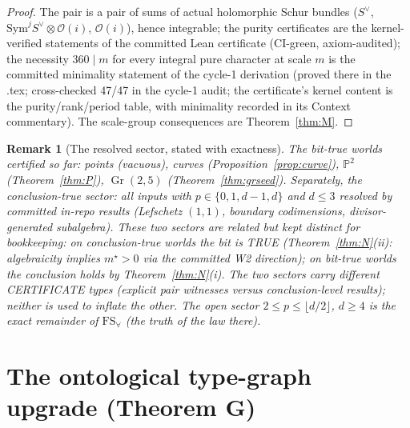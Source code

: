 \documentclass[11pt]{article}
\newtheorem{remark}[theorem]{Remark}
\newcommand{\Oo}{\mathcal{O}}
\newcommand{\tensor}{\otimes}
\newcommand{\Pp}{\mathbb{P}}
\newcommand{\Gr}{\operatorname{Gr}}
\newcommand{\FS}{\mathrm{FS}_\forall}
\begin{document}
\begin{proof}
The pair is a pair of sums of actual holomorphic Schur bundles
($S^\vee$, $\mathrm{Sym}^jS^\vee\tensor\Oo(i)$, $\Oo(i)$), hence integrable;
the purity certificates are the kernel-verified statements of the committed
Lean certificate \cite{GST-gr25} (CI-green, axiom-audited); the necessity
$360\mid m$ for every integral pure character at scale $m$ is the committed
minimality statement of the cycle-1 derivation (proved there in the .tex;
cross-checked 47/47 in the cycle-1 audit; the certificate's kernel content is
the purity/rank/period table, with minimality recorded in its Context
commentary).  The scale-group consequences are Theorem~\ref{thm:M}.
\end{proof}

\begin{remark}[The resolved sector, stated with exactness]
\label{rem:resolved}
The \emph{bit-true} worlds certified so far: points (vacuous), curves
(Proposition~\ref{prop:curve}), $\Pp^2$ (Theorem~\ref{thm:P}),
$\Gr(2,5)$ (Theorem~\ref{thm:grseed}).  Separately, the
\emph{conclusion-true} sector: all inputs with $p\in\{0,1,d-1,d\}$ and
$d\le3$ resolved by committed in-repo results (Lefschetz $(1,1)$,
boundary codimensions, divisor-generated subalgebra).  These two sectors are
related but kept distinct for bookkeeping: on conclusion-true worlds the
bit is TRUE (Theorem~\ref{thm:N}(ii): algebraicity implies $m^\star>0$ via
the committed W2 direction); on bit-true worlds the conclusion holds by
Theorem~\ref{thm:N}(i).  The two sectors carry different CERTIFICATE types
(explicit pair witnesses versus conclusion-level results); neither is used to
inflate the other.  The open sector $2\le p\le\lfloor d/2\rfloor$,
$d\ge4$ is the exact remainder of $\FS$ (the truth of the law there).
\end{remark}

\section{The ontological type-graph upgrade (Theorem G)}
\label{sec:ontology}
\end{document}
